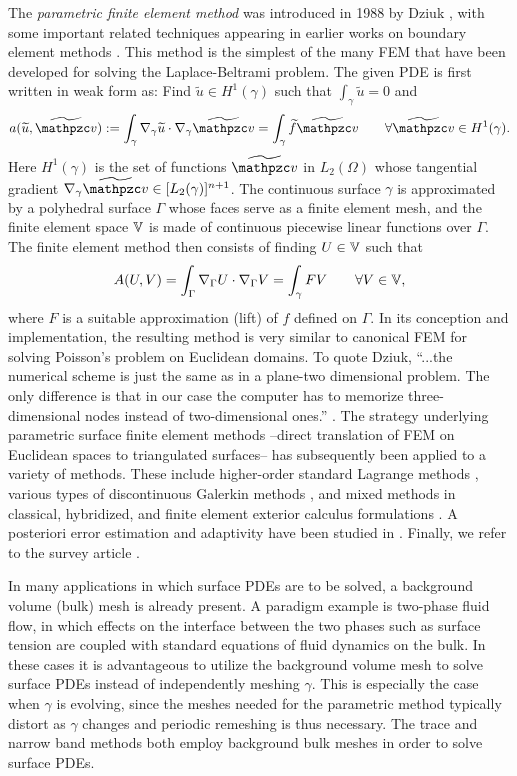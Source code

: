 The {\it parametric finite element method} was introduced in 1988 by Dziuk \cite{Dz88}, with some important related techniques appearing in earlier works on boundary element methods \cite{Ne76, Ben84}.  This method is the simplest of the many FEM that have been developed for solving the Laplace-Beltrami problem.  The given PDE is first written in weak form as:  Find $\widetilde u \in H^1(\gamma)$ such that $\int_\gamma \widetilde u =0$ and  
\[
a(\widetilde u,\widetilde \tv):=\int_\gamma \nabla_\gamma \widetilde u \cdot \nabla_\gamma \widetilde \tv = \int_\gamma \widetilde f \widetilde \tv \qquad \forall \widetilde \tv \in H^1(\gamma).  
\]
Here $H^1(\gamma)$ is the set of functions $\widetilde \tv$ in $L_2(\Omega)$ whose tangential gradient $\nabla_\gamma \widetilde \tv \in [L_2(\gamma)]^{n+1}$.  The continuous surface $\gamma$ is approximated by a polyhedral surface $\Gamma$ whose faces serve as a finite element mesh, and the finite element space $\mathbb{V}$ is made of continuous piecewise linear functions over $\Gamma$.  The finite element method then consists of finding $U \in \mathbb{V}$ such that
\[ 
A(U,V)=\int_\Gamma \nabla_\Gamma U \cdot \nabla_\Gamma V=\int_\gamma F V \qquad \forall V \in \mathbb{V},
\]
where $F$ is a suitable approximation (lift) of $f$ defined on $\Gamma$.  In its conception and implementation, the resulting method is very similar to canonical FEM for solving Poisson's problem on Euclidean domains.    To quote Dziuk, ``...the numerical scheme is just the same as in a plane-two dimensional problem.  The only difference is that in our case the computer has to memorize three-dimensional nodes instead of two-dimensional ones.'' \cite[p. 143]{Dz88}.    The strategy underlying parametric surface finite element methods --direct translation of FEM on Euclidean spaces to triangulated surfaces-- has subsequently been applied to a variety of methods.  These include higher-order standard Lagrange methods \cite{De09}, various types of discontinuous Galerkin methods \cite{ADMSSV15, DMS13, CD16}, and mixed methods in  classical, hybridized, and finite element exterior calculus formulations \cite{Ben84, HoSt12, CD16, FFF16}.   A posteriori error estimation and adaptivity have been studied in \cite{DemlowDziuk:07, WCH10, BCMN:Magenes, DM16, BCMMN16, BD:18}.  Finally, we refer to the survey article \cite{DE13}. 

In many applications in which surface PDEs are to be solved, a background volume (bulk) mesh is already present. A paradigm example is two-phase fluid flow, in which effects on the interface between the two phases such as surface tension are coupled with standard equations of fluid dynamics on the bulk. In these cases it is advantageous to utilize the background volume mesh to solve surface PDEs instead of independently meshing $\gamma$. This is especially the case when $\gamma$ is evolving, since the meshes needed for the parametric method typically distort as $\gamma$ changes and periodic remeshing is thus necessary.  The trace and narrow band methods both employ background bulk meshes in order to solve surface PDEs.  

